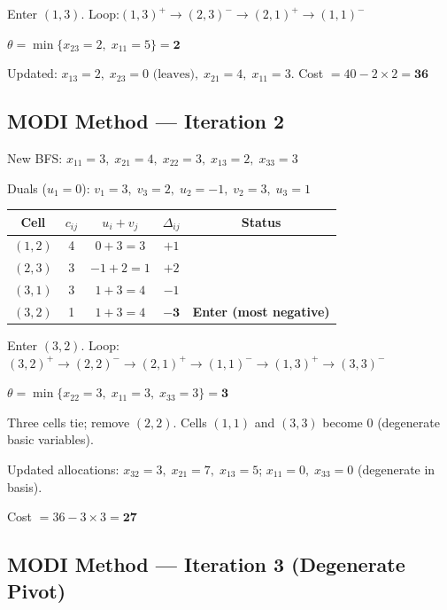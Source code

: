 \documentclass[12pt]{article}
\begin{document}
\vspace{4pt}
Enter $(1,3)$.\quad
Loop:\;$(1,3)^+ \to (2,3)^- \to (2,1)^+ \to (1,1)^-$

$\theta = \min\{x_{23}=2,\;x_{11}=5\} = \mathbf{2}$

Updated: $x_{13}=2,\;x_{23}=0\text{ (leaves)},\;x_{21}=4,\;x_{11}=3$.\quad
Cost $= 40 - 2\times 2 = \mathbf{36}$

\vspace{10pt}

\subsection*{MODI Method --- Iteration 2}

New BFS: $x_{11}=3,\;x_{21}=4,\;x_{22}=3,\;x_{13}=2,\;x_{33}=3$

Duals ($u_1=0$): $v_1=3,\;v_3=2,\;u_2=-1,\;v_2=3,\;u_3=1$

\begin{center}
\renewcommand{\arraystretch}{1.3}
\begin{tabular}{|c|c|c|c|c|}
  \hline
  \rowcolor{primary}
  {\color{white}\textbf{Cell}} & {\color{white}$c_{ij}$} &
  {\color{white}$u_i+v_j$} & {\color{white}$\Delta_{ij}$} & {\color{white}\textbf{Status}} \\
  \hline
  $(1,2)$ & 4 & $0+3=3$ & $+1$ & \\
  \hline
  $(2,3)$ & 3 & $-1+2=1$ & $+2$ & \\
  \hline
  $(3,1)$ & 3 & $1+3=4$ & $-1$ & \\
  \hline
  \rowcolor{red!15}$(3,2)$ & 1 & $1+3=4$ & $\mathbf{-3}$ & \textbf{Enter (most negative)} \\
  \hline
\end{tabular}
\end{center}

Enter $(3,2)$.\quad
Loop:\;$(3,2)^+ \to (2,2)^- \to (2,1)^+ \to (1,1)^- \to (1,3)^+ \to (3,3)^-$

$\theta = \min\{x_{22}=3,\;x_{11}=3,\;x_{33}=3\} = \mathbf{3}$

Three cells tie; remove $(2,2)$. Cells $(1,1)$ and $(3,3)$ become $0$ (degenerate basic variables).

Updated allocations: $x_{32}=3,\;x_{21}=7,\;x_{13}=5$;\; $x_{11}=0,\;x_{33}=0$ (degenerate in basis).

Cost $= 36 - 3\times 3 = \mathbf{27}$

\vspace{10pt}

\subsection*{MODI Method --- Iteration 3 (Degenerate Pivot)}
\end{document}

